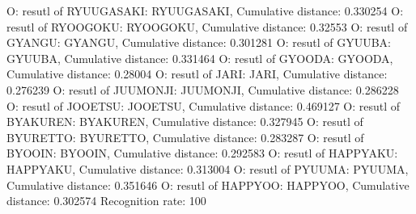 O: resutl of RYUUGASAKI: RYUUGASAKI, Cumulative distance: 0.330254
O: resutl of RYOOGOKU: RYOOGOKU, Cumulative distance: 0.32553
O: resutl of GYANGU: GYANGU, Cumulative distance: 0.301281
O: resutl of GYUUBA: GYUUBA, Cumulative distance: 0.331464
O: resutl of GYOODA: GYOODA, Cumulative distance: 0.28004
O: resutl of JARI: JARI, Cumulative distance: 0.276239
O: resutl of JUUMONJI: JUUMONJI, Cumulative distance: 0.286228
O: resutl of JOOETSU: JOOETSU, Cumulative distance: 0.469127
O: resutl of BYAKUREN: BYAKUREN, Cumulative distance: 0.327945
O: resutl of BYURETTO: BYURETTO, Cumulative distance: 0.283287
O: resutl of BYOOIN: BYOOIN, Cumulative distance: 0.292583
O: resutl of HAPPYAKU: HAPPYAKU, Cumulative distance: 0.313004
O: resutl of PYUUMA: PYUUMA, Cumulative distance: 0.351646
O: resutl of HAPPYOO: HAPPYOO, Cumulative distance: 0.302574
Recognition rate: 100%
